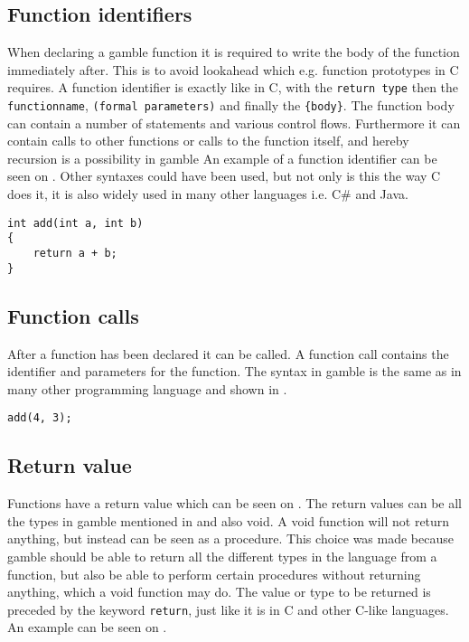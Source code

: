\subsection*{Function identifiers}
When declaring a \gls{gamble} function it is required to write the body of the function immediately after.
This is to avoid lookahead which e.g. function prototypes in C requires.
A function identifier is exactly like in C, with the \texttt{return type} then the \texttt{functionname}, \texttt{(formal parameters)} and finally the \texttt{\{body\}}. %
The function body can contain a number of statements and various control flows.
Furthermore it can contain calls to other functions or calls to the function itself, and hereby recursion is a possibility in \gls{gamble}
An example of a function identifier can be seen on .
Other syntaxes could have been used, but not only is this the way C does it, it is also widely used in many other languages i.e. C\# and Java.

\begin{lstlisting}[caption={Function Identifier},label={lst:functionID},numbers=none]                                                        
int add(int a, int b)
{
    return a + b;
}
\end{lstlisting}

\subsection*{Function calls}
After a function has been declared it can be called. 
A function call contains the identifier and parameters for the function. 
The syntax in \gls{gamble} is the same as in many other programming language and shown in . 

\begin{lstlisting}[caption={A function call in \gls{gamble}},label={lst:functionCall},numbers=none]
add(4, 3);
\end{lstlisting}


\subsection*{Return value}
Functions have a return value which can be seen on .
The return values can be all the types in \gls{gamble} mentioned in  and also void. 
A void function will not return anything, but instead can be seen as a procedure.
This choice was made because \gls{gamble} should be able to return all the different types in the language from a function, but also be able to perform certain procedures without returning anything, which a void function may do.
The value or type to be returned is preceded by the keyword \texttt{return}, just like it is in C and other C-like languages.
An example can be seen on .

